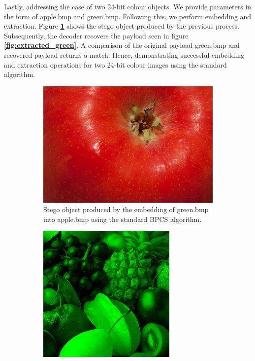 \documentclass{l4proj}
\begin{document}
Lastly, addressing the case of two 24-bit colour objects. We provide parameters in the form of apple.bmp and green.bmp. Following this, we perform embedding and extraction. Figure \textbf{\ref{fig:stego_colourincolour}} shows the stego object produced by the previous process. Subsequently, the decoder recovers the payload seen in figure \textbf{\ref{fig:extracted_green}}. A comparison of the original payload green.bmp and recovered payload returns a match. Hence, demonstrating successful embedding and extraction operations for two 24-bit colour images using the standard algorithm.

\begin{figure}[]
    \centering
    \begin{subfigure}[b]{0.4\textwidth}
        \includegraphics[width=\textwidth]{images/green_in_apple_stego.png}
        \caption{Stego object produced by the embedding of green.bmp into apple.bmp using the standard BPCS algorithm.}
        \label{fig:stego_colourincolour}
    \end{subfigure}
    \begin{subfigure}[b]{0.4\textwidth}
        \includegraphics[width=\textwidth]{images/extracted_green.png}

\end{subfigure}
\end{figure}
\end{document}
